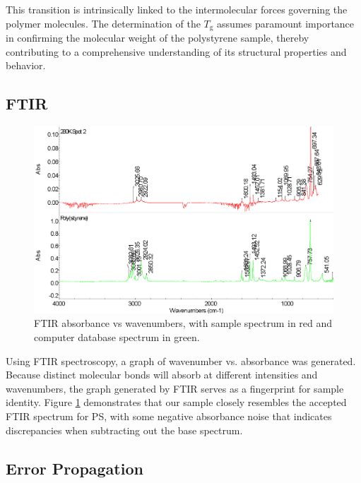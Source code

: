 \documentclass[twocolumn]{article}
\begin{document}
                This transition is intrinsically linked to the intermolecular forces governing the polymer molecules\autocite{WOS:COUCHMAN}. The determination of the $T_\text{g}$ assumes paramount importance in confirming the molecular weight of the polystyrene sample, thereby contributing to a comprehensive understanding of its structural properties and behavior.

            \subsection{FTIR}
                \begin{figure}[H]
                    \centering
                    \includegraphics[width=\columnwidth]{img/ftir-comp.png}
                    \caption{FTIR absorbance vs wavenumbers, with sample spectrum in red and computer database spectrum in green.}\label{fig:ftir-comp}
                \end{figure}
                Using FTIR spectroscopy, a graph of wavenumber vs. absorbance  was generated. Because distinct  molecular bonds will absorb at different intensities and wavenumbers, the graph generated by FTIR serves as a fingerprint for sample identity. Figure \ref{fig:ftir-comp} demonstrates that our sample closely resembles the accepted FTIR spectrum for PS, with some negative absorbance noise that indicates discrepancies when subtracting out the base spectrum.
            

            \subsection{Error Propagation}
\end{document}
